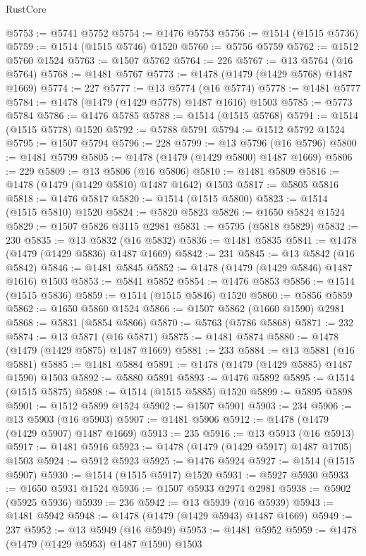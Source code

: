 \begin{lexlean}{RustCore}
\begin{coremodule}
@5753 := @5741 @5752
@5754 := @1476 @5753
@5756 := @1514 (@1515 @5736)
@5759 := @1514 (@1515 @5746) @1520
@5760 := @5756 @5759
@5762 := @1512 @5760 @1524
@5763 := @1507 @5762
@5764 := 226
@5767 := @13 @5764 (@16 @5764)
@5768 := @1481 @5767
@5773 := @1478 (@1479 (@1429 @5768) @1487 @1669)
@5774 := 227
@5777 := @13 @5774 (@16 @5774)
@5778 := @1481 @5777
@5784 := @1478 (@1479 (@1429 @5778) @1487 @1616) @1503
@5785 := @5773 @5784
@5786 := @1476 @5785
@5788 := @1514 (@1515 @5768)
@5791 := @1514 (@1515 @5778) @1520
@5792 := @5788 @5791
@5794 := @1512 @5792 @1524
@5795 := @1507 @5794
@5796 := 228
@5799 := @13 @5796 (@16 @5796)
@5800 := @1481 @5799
@5805 := @1478 (@1479 (@1429 @5800) @1487 @1669)
@5806 := 229
@5809 := @13 @5806 (@16 @5806)
@5810 := @1481 @5809
@5816 := @1478 (@1479 (@1429 @5810) @1487 @1642) @1503
@5817 := @5805 @5816
@5818 := @1476 @5817
@5820 := @1514 (@1515 @5800)
@5823 := @1514 (@1515 @5810) @1520
@5824 := @5820 @5823
@5826 := @1650 @5824 @1524
@5829 := @1507 @5826 @3115 @2981
@5831 := @5795 (@5818 @5829)
@5832 := 230
@5835 := @13 @5832 (@16 @5832)
@5836 := @1481 @5835
@5841 := @1478 (@1479 (@1429 @5836) @1487 @1669)
@5842 := 231
@5845 := @13 @5842 (@16 @5842)
@5846 := @1481 @5845
@5852 := @1478 (@1479 (@1429 @5846) @1487 @1616) @1503
@5853 := @5841 @5852
@5854 := @1476 @5853
@5856 := @1514 (@1515 @5836)
@5859 := @1514 (@1515 @5846) @1520
@5860 := @5856 @5859
@5862 := @1650 @5860 @1524
@5866 := @1507 @5862 (@1660 @1590) @2981
@5868 := @5831 (@5854 @5866)
@5870 := @5763 (@5786 @5868)
@5871 := 232
@5874 := @13 @5871 (@16 @5871)
@5875 := @1481 @5874
@5880 := @1478 (@1479 (@1429 @5875) @1487 @1669)
@5881 := 233
@5884 := @13 @5881 (@16 @5881)
@5885 := @1481 @5884
@5891 := @1478 (@1479 (@1429 @5885) @1487 @1590) @1503
@5892 := @5880 @5891
@5893 := @1476 @5892
@5895 := @1514 (@1515 @5875)
@5898 := @1514 (@1515 @5885) @1520
@5899 := @5895 @5898
@5901 := @1512 @5899 @1524
@5902 := @1507 @5901
@5903 := 234
@5906 := @13 @5903 (@16 @5903)
@5907 := @1481 @5906
@5912 := @1478 (@1479 (@1429 @5907) @1487 @1669)
@5913 := 235
@5916 := @13 @5913 (@16 @5913)
@5917 := @1481 @5916
@5923 := @1478 (@1479 (@1429 @5917) @1487 @1705) @1503
@5924 := @5912 @5923
@5925 := @1476 @5924
@5927 := @1514 (@1515 @5907)
@5930 := @1514 (@1515 @5917) @1520
@5931 := @5927 @5930
@5933 := @1650 @5931 @1524
@5936 := @1507 @5933 @2974 @2981
@5938 := @5902 (@5925 @5936)
@5939 := 236
@5942 := @13 @5939 (@16 @5939)
@5943 := @1481 @5942
@5948 := @1478 (@1479 (@1429 @5943) @1487 @1669)
@5949 := 237
@5952 := @13 @5949 (@16 @5949)
@5953 := @1481 @5952
@5959 := @1478 (@1479 (@1429 @5953) @1487 @1590) @1503

\end{coremodule}
\end{lexlean}
